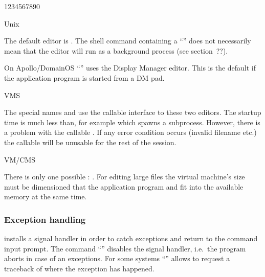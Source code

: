 \begin{DL}{1234567890}
\item[Unix]

The default editor is .
The shell command containing a ``\Lit{&}'' does not necessarily mean
that the editor will run as a background process (see section~??).

On Apollo/DomainOS ``'' uses the Display Manager editor.
This is the default if the application program is started from a DM pad.


\item[VMS]

The special names  and  use the callable interface
to these two editors.
The startup time is much less than, for example  which spawns a
subprocess.
However, there is a problem with the callable .
If any error condition occurs (invalid filename etc.) the callable
 will be unusable for the rest of the session.


\item[VM/CMS]

There is only one possible : .
For editing large files the virtual machine's size must be
dimensioned that the application program and  fit into the
available memory at the same time.

\end{DL}


\subsubsection{Exception handling}

\KUIP{} installs a signal handler in order to catch exceptions and return to
the command input prompt.
The command ``'' disables the signal handler, i.e.\ the
program aborts in case of an exceptions.
For some systems ``'' allows to request a traceback of
where the exception has happened.


